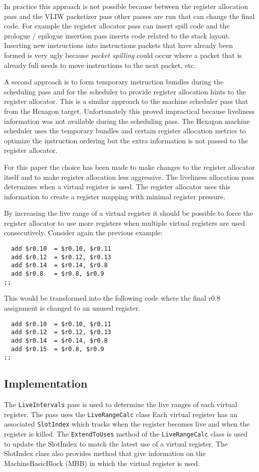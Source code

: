 In practice this approach is not possible because between the register allocation pass and the VLIW packetizer pass other passes are run that can change the final code. For example the register allocator pass can insert spill code and the prologue / epilogue insertion pass inserts code related to the stack layout. Inserting new instructions into instructions packets that have already been formed is very ugly because \emph{packet spilling} could occur where a packet that is already full needs to move instructions to the next packet, etc. 

A second approach is to form temporary instruction bundles during the scheduling pass and for the scheduler to provide register allocation hints to the register allocator. This is a similar approach to the machine scheduler pass that from the Hexagon target. Unfortunately this proved impractical because liveliness information was not available during the scheduling pass. The Hexagon machine scheduler uses the temporary bundles and certain register allocation metrics to optimize the instruction ordering but the extra information is not passed to the register allocator.

For this paper the choice has been made to make changes to the register allocator itself and to make register allocation less aggressive. The liveliness allocation pass determines when a virtual register is used. The register allocator uses this information to create a register mapping with minimal register pressure.

By increasing the live range of a virtual register it should be possible to force the register allocator to use more registers when multiple virtual registers are used consecutively. Consider again the previous example:

\begin{lstlisting}
  add $r0.10  = $r0.10, $r0.11
  add $r0.12  = $r0.12, $r0.13
  add $r0.14  = $r0.14, $r0.8
  add $r0.8   = $r0.8, $r0.9
;;
\end{lstlisting}

This would be transformed into the following code where the final r0.8 assignment is changed to an unused register. 

\begin{lstlisting}
  add $r0.10  = $r0.10, $r0.11
  add $r0.12  = $r0.12, $r0.13
  add $r0.14  = $r0.14, $r0.8
  add $r0.15  = $r0.8, $r0.9
;;
\end{lstlisting}

\subsection{Implementation} %
\label{sub:implementation}
The \texttt{LiveIntervals} pass is used to determine the live ranges of each virtual register. The pass uses the \texttt{LiveRangeCalc} class
Each virtual register has an associated \texttt{SlotIndex} which tracks when the register becomes live and when the register is killed. The \texttt{ExtendToUses} method of the \texttt{LiveRangeCalc} class is used to update the SlotIndex to match the latest use of a virtual register. The SlotIndex class also provides method that give information on the MachineBasicBlock (MBB) in which the virtual register is used.

